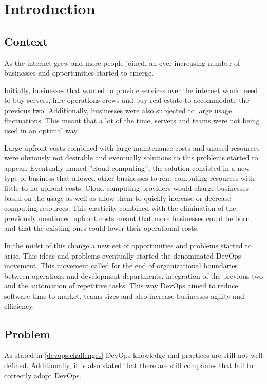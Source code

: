 \chapter{Introduction} \label{chap:introduction}

\section{Context} \label{chap:introduction:section:context}

	As the internet grew and more people joined, an ever increasing number of
businesses and opportunities started to emerge.
	
    Initially, businesses that wanted to provide services over the internet would need to buy servers, hire operations crews and buy real estate to accommodate the previous two. Additionally, businesses were also subjected to large usage fluctuations. This meant that a lot of the time, servers and teams were not being used in an optimal way. 
    
    Large upfront costs combined with large maintenance costs and unused resources were obviously not desirable and eventually solutions to this problems started to appear. Eventually named ”cloud computing”, the solution consisted in a new type of business that allowed other businesses to rent computing resources with little to no upfront costs. Cloud computing providers would charge businesses based on the usage as well as allow them to quickly increase or decrease computing resources. This elasticity combined with the elimination of the previously mentioned upfront costs meant that more businesses could be born and that the existing ones could lower their operational costs.

	In the midst of this change a new set of opportunities and problems started to arise. This ideas and problems eventually started the denominated DevOps movement. This movement called for the end of organizational boundaries between operations and development departments, integration of the previous two and the automation of repetitive tasks. This way DevOps aimed to reduce software time to market, teams sizes and also increase businesses agility and efficiency.	

\section{Problem} \label{chap:problem:section:context}

As stated in \ref{devops:challenges} DevOps knowledge and practices are still not well defined. Additionally, it is also stated that there are still companies that fail to correctly adopt DevOps. 

